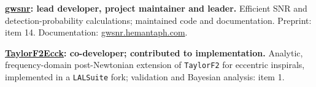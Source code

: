 \documentclass[10pt]{article}
\begin{document}
\textbf{\href{https://gwsnr.hemantaph.com/}{gwsnr}: lead developer, project maintainer and leader.} Efficient SNR and detection-probability calculations; maintained code and documentation. Preprint: item 14. Documentation: \href{https://gwsnr.hemantaph.com/}{gwsnr.hemantaph.com}.

\textbf{\href{https://arxiv.org/abs/2508.12697}{TaylorF2Ecck}: co-developer; contributed to implementation.} Analytic, frequency-domain post-Newtonian extension of \texttt{TaylorF2} for eccentric inspirals, implemented in a \texttt{LALSuite} fork; validation and Bayesian analysis: item 1.
\end{document}
